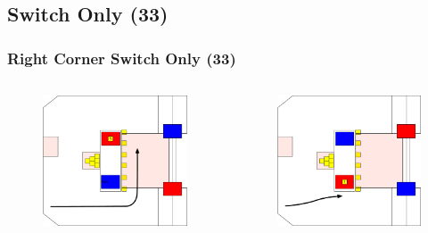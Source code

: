 \documentclass{beamer}
\begin{document}
\subsection{Switch Only (33)}

\begin{frame}
 \frametitle{Right Corner Switch Only \alert{(33)}}
 \begin{columns}
  \begin{figure}
   \includegraphics[scale=0.15]{assets/paths/33_LR}
  \end{figure}
  \begin{figure}
   \includegraphics[scale=0.15]{assets/paths/33_RL}

\end{figure}
\end{columns}
\end{frame}
\end{document}
